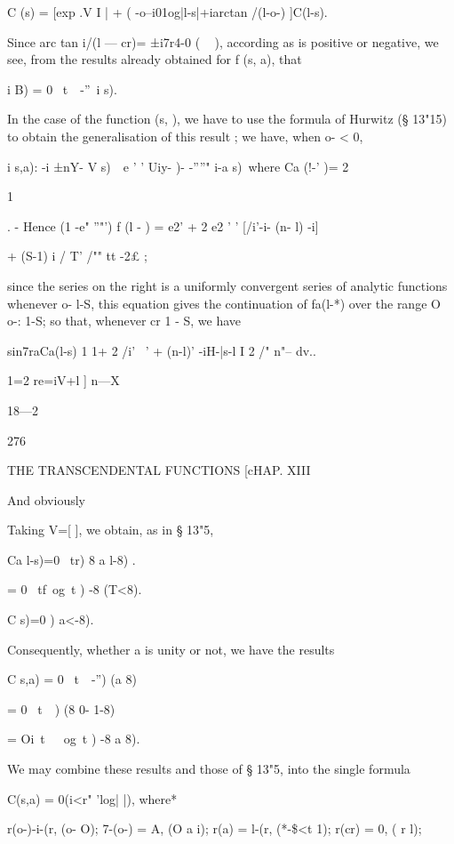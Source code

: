 {{C (s) = [exp .V I | + ( -o--i01og|l-s|+iarctan /(l-o-) ]C(l-s).

Since arc tan i/(l — cr)= ±i7r4-0 ( ~ ), according as is positive or
negative, we see, from the results already obtained for f (s, a), that

i B) = 0 \ t\ \ -''\ i s).

In the case of the function (s, ), we have to use the formula of
Hurwitz (§ 13"15) to obtain the generalisation of this result ; we
have, when o- < 0,

i s,a): -i ±nY- V s)\ \ e ' ' Uiy- )- -''''" i-a s)\ where Ca (!-' )=
2



1 %

. - Hence (1 -e" ''"') f (l - ) = e2' + 2 e2 ' ' [/i'-i- (n- l) -i]



+ (S-1) i / T' /"" tt -2£ ;



since the series on the right is a uniformly convergent series of
analytic functions whenever o- l-S, this equation gives the
continuation of fa(l-*) over the range O o-: 1-S; so that, whenever cr
1 - S, we have

sin7raCa(l-s) 1 1+ 2 /i' ~' + (n-l)' -iH-|s-l I 2 /" n"-- dv..

1=2 re=iV+l ] n—X

18—2



276



THE TRANSCENDENTAL FUNCTIONS [cHAP. XIII



And obviously



Taking V=[ ], we obtain, as in § 13"5,

Ca l-s)=0 \ tr) 8 a l-8) .

= 0 \ tf\ og\ t ) -8 (T<8).

C s)=0 ) a<-8).

Consequently, whether a is unity or not, we have the results

C s,a) = 0 \ t\ \ -'') (a 8)

= 0 \ t\ \ ) (8 0- 1-8)

= Oi\ t\ \ \ og\ t ) -8 a 8).

We may combine these results and those of § 13"5, into the single
formula

C(s,a) = 0(i<r" 'log| |), where*

r(o-)-i-(r, (o- O); 7-(o-) = A, (O a i); r(a) = l-(r, (*-\$<t 1);
r(cr) = 0, ( r l);

}}
